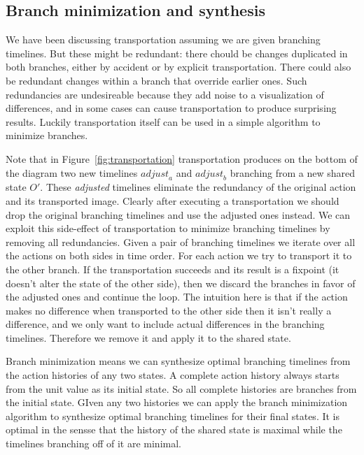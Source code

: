 \documentclass[english,submission]{programming}
\theoremstyle{definition}
\begin{document}
\subsection{Branch minimization and synthesis}

We have been discussing transportation assuming we are given branching timelines. But these might be redundant: there chould be changes duplicated in both branches, either by accident or by explicit transportation. There could also be redundant changes within a branch that override earlier ones. Such redundancies are undesireable because they add noise to a visualization of differences, and in some cases can cause transportation to produce surprising results. Luckily transportation itself can be used in a simple algorithm to minimize branches.

Note that in Figure~\ref{fig:transportation} transportation produces on the bottom of the diagram two new timelines $\mathit{adjust}_a$ and $\mathit{adjust}_b$ branching from a new shared state $O'$. These \textit{adjusted} timelines eliminate the redundancy of the original action and its transported image. Clearly after executing a transportation we should drop the original branching timelines and use the adjusted ones instead. We can exploit this side-effect of transportation to minimize branching timelines by removing all redundancies. Given a pair of branching timelines we iterate over all the actions on both sides in time order. For each action we try to transport it to the other branch. If the transportation succeeds and its result is a fixpoint (it doesn't alter the state of the other side), then we discard the branches in favor of the adjusted ones and continue the loop. The intuition here is that if the action makes no difference when transported to the other side then it isn't really a difference, and we only want to include actual differences in the branching timelines. Therefore we remove it and apply it to the shared state.

Branch minimization means we can synthesize optimal branching timelines from the action histories of any two states. A complete action history always starts from the unit value as its initial state. So all complete histories are branches from the initial state. GIven any two histories we can apply the branch minimization algorithm to synthesize optimal branching timelines for their final states. It is optimal in the sensse that the history of the shared state is maximal while the timelines branching off of it are minimal.
\end{document}
